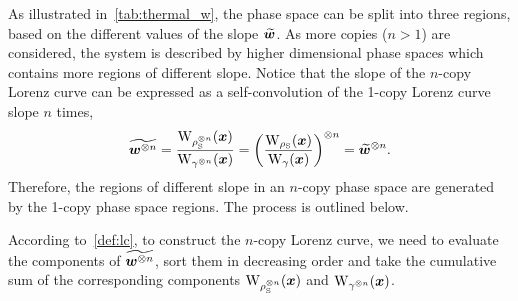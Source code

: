 \documentclass[pra,
aps,
twocolumn,
superscriptaddress,
groupedaddress,
nofootinbib,
reprint
]{revtex4-1}
\begin{document}
As illustrated in~\cref{tab:thermal_w}, the phase space can be split into three regions, based on the different values of the slope $\widetilde{\bm{w}}$.
As more copies ($n>1$) are considered, the system is described by higher dimensional phase spaces which contains more regions of different slope.
Notice that the slope of the $n$-copy Lorenz curve can be expressed as a self-convolution of the 1-copy Lorenz curve slope $n$ times,
\begin{equation}
	\widetilde{\bmw\too{n}} = \frac{\W{\noisys\too{n}}(\bmx)}{\W{\gamma\too{n}}(\bmx)} = \left( \frac{\W{\noisys}(\bmx)}{\W{\gamma}(\bmx)} \right)\too{n} = \widetilde{\bmw}\too{n}.
\end{equation}
Therefore, the regions of different slope in an $n$-copy phase space are generated by the 1-copy phase space regions.
The process is outlined below.

According to~\cref{def:lc}, to construct the $n$-copy Lorenz curve, we need to evaluate the components of $\widetilde{\bm{w}^{\otimes n}}$, sort them in decreasing order and take the cumulative sum of the corresponding components $\W{\noisys\too{n}}(\bmx)$ and $\W{\gamma\too{n}}(\bmx)$.
\end{document}
